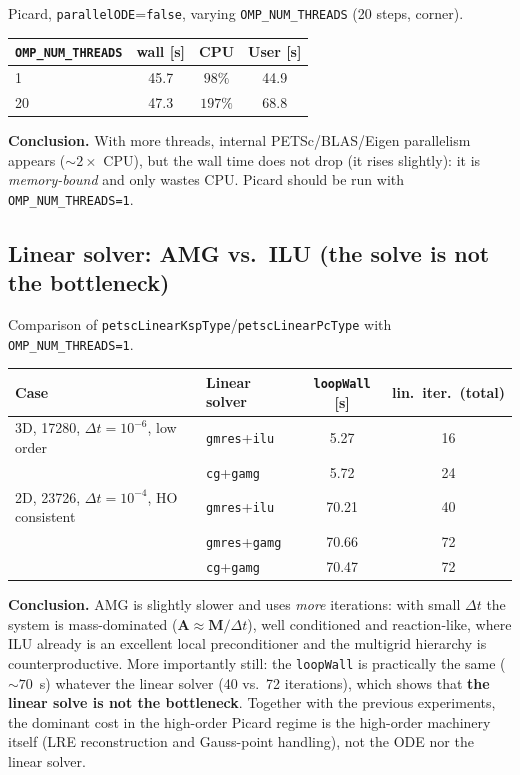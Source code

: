 \documentclass[11pt,a4paper]{article}
\newcommand{\code}[1]{\texttt{\small #1}}
\newcommand{\Mmass}{\mathbf{M}}
\newcommand{\Aimp}{\mathbf{A}}
\newcommand{\dictkey}[1]{\textcolor{black!60!green}{\texttt{\footnotesize #1}}}
\begin{document}
Picard, \dictkey{parallelODE}=\code{false}, varying \code{OMP\_NUM\_THREADS}
(20 steps, corner).

\begin{center}
\begin{tabular}{@{}lccc@{}}
\toprule
\code{OMP\_NUM\_THREADS} & wall [s] & CPU & User [s] \\
\midrule
1  & 45.7 & $98\%$  & 44.9 \\
20 & 47.3 & $197\%$ & 68.8 \\
\bottomrule
\end{tabular}
\end{center}

\noindent\textbf{Conclusion.} With more threads, internal PETSc/BLAS/Eigen
parallelism appears ($\sim 2\times$ CPU), but the wall time does not drop (it rises
slightly): it is \emph{memory-bound} and only wastes CPU. Picard should be run
with \code{OMP\_NUM\_THREADS=1}.

\subsection{Linear solver: AMG vs.\ ILU (the solve is not the bottleneck)}
\label{sec:exp-gamg}

Comparison of \dictkey{petscLinearKspType}/\dictkey{petscLinearPcType} with
\code{OMP\_NUM\_THREADS=1}.

\begin{center}
\begin{tabular}{@{}llcc@{}}
\toprule
Case & Linear solver & \code{loopWall} [s] & lin.\ iter.\ (total) \\
\midrule
3D, \num{17280}, $\Delta t{=}10^{-6}$, low order
   & \code{gmres}+\code{ilu}  & 5.27 & 16 \\
   & \code{cg}+\code{gamg}    & 5.72 & 24 \\
\midrule
2D, \num{23726}, $\Delta t{=}10^{-4}$, HO consistent
   & \code{gmres}+\code{ilu}  & 70.21 & 40 \\
   & \code{gmres}+\code{gamg} & 70.66 & 72 \\
   & \code{cg}+\code{gamg}    & 70.47 & 72 \\
\bottomrule
\end{tabular}
\end{center}

\noindent\textbf{Conclusion.} AMG is slightly slower and uses \emph{more}
iterations: with small $\Delta t$ the system is mass-dominated
($\Aimp\approx\Mmass/\Delta t$), well conditioned and reaction-like, where ILU already
is an excellent local preconditioner and the multigrid hierarchy is
counterproductive. More importantly still: the \code{loopWall} is practically the same
($\sim 70$~s) whatever the linear solver (40 vs.\ 72 iterations), which
shows that \textbf{the linear solve is not the bottleneck}. Together with the
previous experiments, the dominant cost in the high-order Picard regime is the
high-order machinery itself (LRE reconstruction and Gauss-point handling),
not the ODE nor the linear solver.
\end{document}
